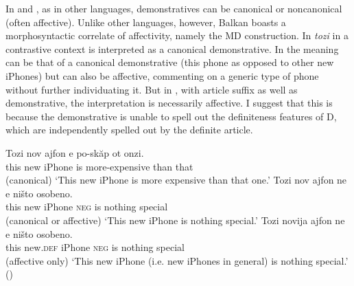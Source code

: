 \documentclass[output=paper]{langscibook}
\begin{document}
In  and , as in other languages, demonstratives can be canonical or noncanonical (often affective). Unlike other languages, however, Balkan  boasts a morphosyntactic correlate of affectivity, namely the MD construction. In  \textit{tozi} in a contrastive context is interpreted as a canonical demonstrative. In  the meaning can be that of a canonical demonstrative (this phone as opposed to other new iPhones) but can also be affective, commenting on a generic type of phone without further individuating it. But in , with article suffix as well as demonstrative, the interpretation is necessarily affective. I suggest that this is because the demonstrative is unable to spell out the definiteness features of D, which are independently spelled out by the definite article.

\ea \label{iphone} \ea \label{phone1}
\gll Tozi nov ajfon e po-skăp ot onzi. \\
this new iPhone is more-expensive than that \\\hfill (canonical)
\glt `This new iPhone is more expensive than that one.'
\ex \label{phone2}
\gll Tozi nov ajfon ne e ništo osobeno.\\
 this new iPhone \textsc{neg} is nothing special \\\hfill (canonical or affective)
 \glt `This new iPhone is nothing special.'
 \ex \label{phone3}
 \gll Tozi novija ajfon ne e ništo osobeno.\\
 this new.\textsc{def} iPhone \textsc{neg} is nothing special \\\hfill (affective only)
 \glt `This new iPhone (i.e. new iPhones in general) is nothing special.'
 \glt \hfill ()
\z \z
\end{document}
